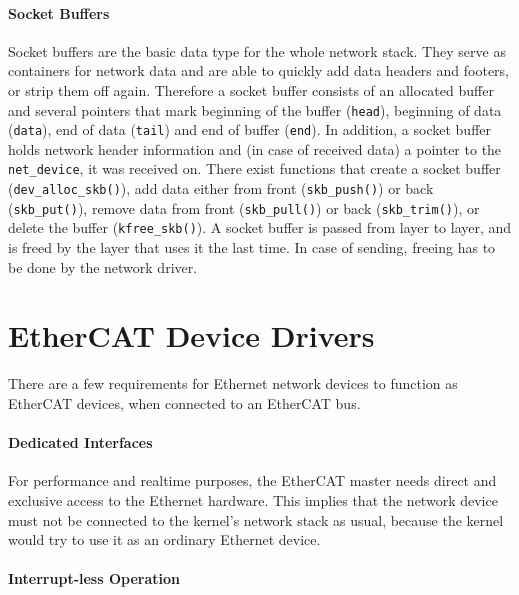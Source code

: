 \documentclass[a4paper,12pt,BCOR6mm,bibtotoc,idxtotoc]{scrbook}
\begin{document}
\paragraph{Socket Buffers}

Socket buffers are the basic data type for the whole network stack. They serve
as containers for network data and are able to quickly add data headers and
footers, or strip them off again. Therefore a socket buffer consists of an
allocated buffer and several pointers that mark beginning of the buffer
(\lstinline+head+), beginning of data (\lstinline+data+), end of data
(\lstinline+tail+) and end of buffer (\lstinline+end+). In addition, a socket
buffer holds network header information and (in case of received data) a
pointer to the \lstinline+net_device+, it was received on. There exist
functions that create a socket buffer (\lstinline+dev_alloc_skb()+), add data
either from front (\lstinline+skb_push()+) or back (\lstinline+skb_put()+),
remove data from front (\lstinline+skb_pull()+) or back
(\lstinline+skb_trim()+), or delete the buffer (\lstinline+kfree_skb()+).  A
socket buffer is passed from layer to layer, and is freed by the layer that
uses it the last time. In case of sending, freeing has to be done by the
network driver.


\section{EtherCAT Device Drivers}
\label{sec:drivers}

There are a few requirements for Ethernet network devices to function as
EtherCAT devices, when connected to an EtherCAT bus.

\paragraph{Dedicated Interfaces}

For performance and realtime purposes, the EtherCAT master needs direct and
exclusive access to the Ethernet hardware. This implies that the network device
must not be connected to the kernel's network stack as usual, because the
kernel would try to use it as an ordinary Ethernet device.

\paragraph{Interrupt-less Operation}
\end{document}
